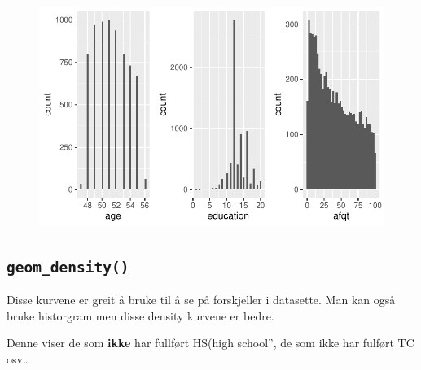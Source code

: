 \documentclass[
  letterpaper,
  DIV=11,
  numbers=noendperiod]{scrartcl}
\begin{document}
\begin{figure}[H]

{\centering \includegraphics{EDA_files/figure-pdf/unnamed-chunk-17-1.pdf}

}

\end{figure}

\hypertarget{geom_density}{%
\subsection{\texorpdfstring{\texttt{geom\_density()}}{geom\_density()}}\label{geom_density}}

Disse kurvene er greit å bruke til å se på forskjeller i datasette. Man
kan også bruke historgram men disse density kurvene er bedre.

Denne viser de som \textbf{ikke} har fullført HS(high school'', de som
ikke har fulført TC osv\ldots{}
\end{document}
